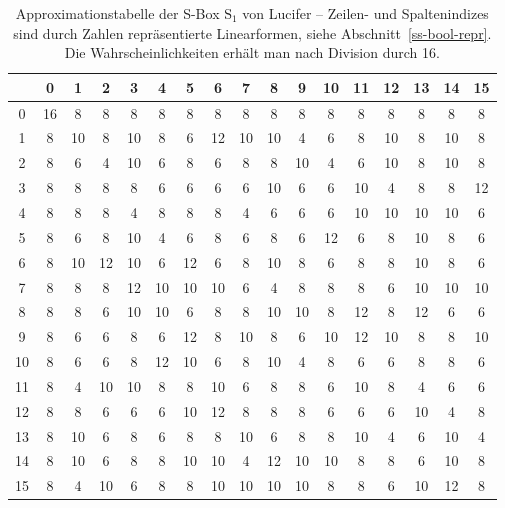 \begin{refsegment}
\begin{table}
\begin{center}
\begin{tabular}{|c|cccccccccccccccc|} \hline
     & 0 & 1 & 2 & 3 & 4 & 5 & 6 & 7 & 8 & 9 &10 &11 &12 &13 &14 &15 \\ \hline
   0 &16 & 8 & 8 & 8 & 8 & 8 & 8 & 8 & 8 & 8 & 8 & 8 & 8 & 8 & 8 & 8 \\
   1 & 8 &10 & 8 &10 & 8 & 6 &12 &10 &10 & 4 & 6 & 8 &10 & 8 &10 & 8 \\
   2 & 8 & 6 & 4 &10 & 6 & 8 & 6 & 8 & 8 &10 & 4 & 6 &10 & 8 &10 & 8 \\
   3 & 8 & 8 & 8 & 8 & 6 & 6 & 6 & 6 &10 & 6 & 6 &10 & 4 & 8 & 8 &12 \\
   4 & 8 & 8 & 8 & 4 & 8 & 8 & 8 & 4 & 6 & 6 & 6 &10 &10 &10 &10 & 6 \\
   5 & 8 & 6 & 8 &10 & 4 & 6 & 8 & 6 & 8 & 6 &12 & 6 & 8 &10 & 8 & 6 \\
   6 & 8 &10 &12 &10 & 6 &12 & 6 & 8 &10 & 8 & 6 & 8 & 8 &10 & 8 & 6 \\
   7 & 8 & 8 & 8 &12 &10 &10 &10 & 6 & 4 & 8 & 8 & 8 & 6 &10 &10 &10 \\
   8 & 8 & 8 & 6 &10 &10 & 6 & 8 & 8 &10 &10 & 8 &12 & 8 &12 & 6 & 6 \\
   9 & 8 & 6 & 6 & 8 & 6 &12 & 8 &10 & 8 & 6 &10 &12 &10 & 8 & 8 &10 \\
  10 & 8 & 6 & 6 & 8 &12 &10 & 6 & 8 &10 & 4 & 8 & 6 & 6 & 8 & 8 & 6 \\
  11 & 8 & 4 &10 &10 & 8 & 8 &10 & 6 & 8 & 8 & 6 &10 & 8 & 4 & 6 & 6 \\
  12 & 8 & 8 & 6 & 6 & 6 &10 &12 & 8 & 8 & 8 & 6 & 6 & 6 &10 & 4 & 8 \\
  13 & 8 &10 & 6 & 8 & 6 & 8 & 8 &10 & 6 & 8 & 8 &10 & 4 & 6 &10 & 4 \\
  14 & 8 &10 & 6 & 8 & 8 &10 &10 & 4 &12 &10 &10 & 8 & 8 & 6 &10 & 8 \\
  15 & 8 & 4 &10 & 6 & 8 & 8 &10 &10 &10 &10 & 8 & 8 & 6 &10 &12 & 8 \\ \hline
\end{tabular}
\end{center}
\caption{Approximationstabelle der S-Box $\mathrm{S}_1$ von {\sc Lucifer} --
   Zeilen- und Spaltenindizes sind durch Zahlen repräsentierte Linearformen,
   siehe Abschnitt~\ref{ss-bool-repr}.
   Die Wahrscheinlichkeiten erhält man nach Division durch 16.}\label{tab-bool-s1}
\end{table}


\end{refsegment}
